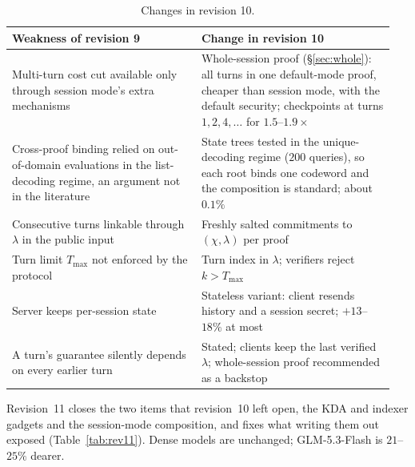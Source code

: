 \documentclass[11pt]{article}
\begin{document}
\begin{table}[h]
\centering\small
\begin{tabular}{@{}p{0.47\linewidth}p{0.48\linewidth}@{}}
\toprule
Weakness of revision 9 & Change in revision 10 \\
\midrule
Multi-turn cost cut available only through session mode's extra mechanisms & Whole-session proof (\S\ref{sec:whole}): all turns in one default-mode proof, cheaper than session mode, with the default security; checkpoints at turns \(1, 2, 4, \ldots\) for \(1.5\)--\(1.9\times\) \\
Cross-proof binding relied on out-of-domain evaluations in the list-decoding regime, an argument not in the literature & State trees tested in the unique-decoding regime (\(200\) queries), so each root binds one codeword and the composition is standard; about \(0.1\%\) \\
Consecutive turns linkable through \(\lambda\) in the public input & Freshly salted commitments to \((\chi, \lambda)\) per proof \\
Turn limit \(T_{\max}\) not enforced by the protocol & Turn index in \(\lambda\); verifiers reject \(k > T_{\max}\) \\
Server keeps per-session state & Stateless variant: client resends history and a session secret; \(+13\)--\(18\%\) at most \\
A turn's guarantee silently depends on every earlier turn & Stated; clients keep the last verified \(\lambda\); whole-session proof recommended as a backstop \\
\bottomrule
\end{tabular}
\caption{Changes in revision 10.}
\label{tab:rev10}
\end{table}

Revision~11 closes the two items that revision~10 left open, the KDA and indexer gadgets and the session-mode composition, and fixes what writing them out exposed (Table~\ref{tab:rev11}). Dense models are unchanged; GLM-5.3-Flash is \(21\)--\(25\%\) dearer.
\end{document}
